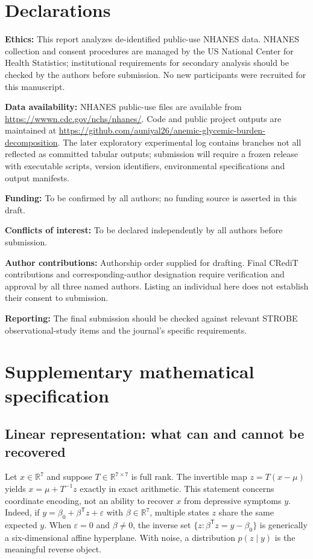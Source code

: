 \documentclass[11pt,a4paper]{article}
\newcommand{\R}{\mathbb{R}}
\begin{document}
\section*{Declarations}
\textbf{Ethics:} This report analyzes de-identified public-use NHANES data. NHANES collection and consent procedures are managed by the US National Center for Health Statistics; institutional requirements for secondary analysis should be checked by the authors before submission. No new participants were recruited for this manuscript.

\textbf{Data availability:} NHANES public-use files are available from \url{https://wwwn.cdc.gov/nchs/nhanes/}. Code and public project outputs are maintained at \url{https://github.com/auniyal26/anemic-glycemic-burden-decomposition}. The later exploratory experimental log contains branches not all reflected as committed tabular outputs; submission will require a frozen release with executable scripts, version identifiers, environmental specifications and output manifests.

\textbf{Funding:} To be confirmed by all authors; no funding source is asserted in this draft.

\textbf{Conflicts of interest:} To be declared independently by all authors before submission.

\textbf{Author contributions:} Authorship order supplied for drafting. Final CRediT contributions and corresponding-author designation require verification and approval by all three named authors. Listing an individual here does not establish their consent to submission.

\textbf{Reporting:} The final submission should be checked against relevant STROBE observational-study items \cite{strobe2007} and the journal's specific requirements.

\appendix
\section{Supplementary mathematical specification}
\subsection{Linear representation: what can and cannot be recovered}
Let $x\in\R^7$ and suppose $T\in\R^{7\times7}$ is full rank. The invertible map $z=T(x-\mu)$ yields $x=\mu+T^{-1}z$ exactly in exact arithmetic. This statement concerns coordinate encoding, not an ability to recover $x$ from depressive symptoms $y$. Indeed, if $y=\beta_0+\beta^{\mathsf T}z+\varepsilon$ with $\beta\in\R^7$, multiple states $z$ share the same expected $y$. When $\varepsilon=0$ and $\beta\ne0$, the inverse set $\{z:\beta^{\mathsf T}z=y-\beta_0\}$ is generically a six-dimensional affine hyperplane. With noise, a distribution $p(z\mid y)$ is the meaningful reverse object.
\end{document}
